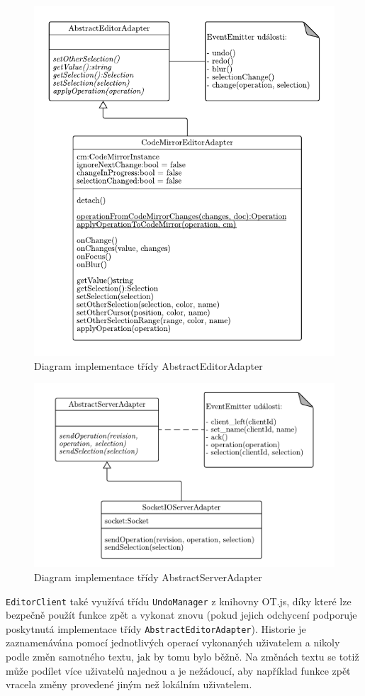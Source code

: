 \begin{figure}[ht!]
    \centering
    \includegraphics[width=.8\textwidth]{partials/navrh/editor/AbstractEditorAdapter.pdf}
    \caption{Diagram implementace třídy AbstractEditorAdapter}\label{fig:AbstractEditorAdapter}
\end{figure}

\begin{figure}[ht!]
    \centering
    \includegraphics[width=.8\textwidth]{partials/navrh/editor/AbstractServerAdapter.pdf}
    \caption{Diagram implementace třídy AbstractServerAdapter}\label{fig:AbstractServerAdapter}
\end{figure}

\texttt{EditorClient} také využívá třídu \texttt{UndoManager} z knihovny OT.js, díky které lze bezpečně použít funkce zpět a vykonat znovu (pokud jejich odchycení podporuje poskytnutá implementace třídy \texttt{AbstractEditorAdapter}).
Historie je zaznamenávána pomocí jednotlivých operací vykonaných uživatelem a nikoly podle změn samotného textu, jak by tomu bylo běžně.
Na změnách textu se totiž může podílet více uživatelů najednou a je nežádoucí, aby například funkce zpět vracela změny provedené jiným než lokálním uživatelem.


